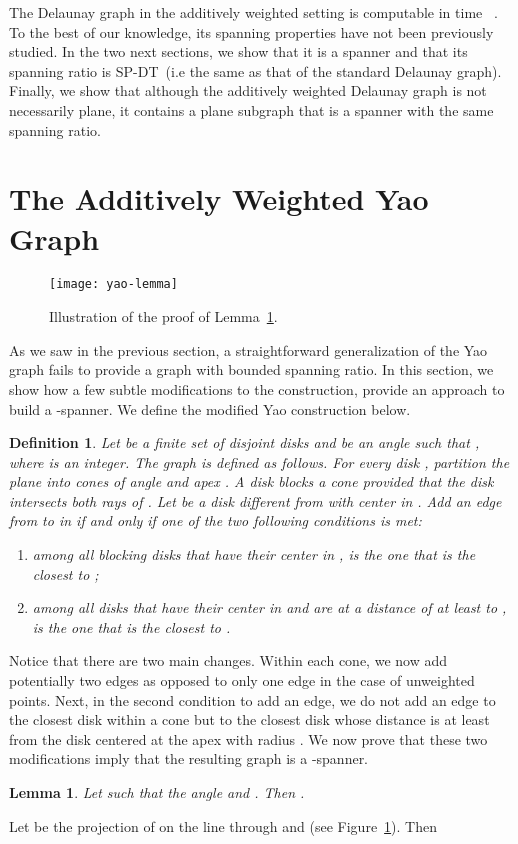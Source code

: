 \documentclass[pdftex,leqno,fleqn,12pt]{article}
\newcommand{\sdsr}{{\rm{SP-DT}}}
\newtheorem{lemma}[theorem]{Lemma}
\newtheorem{definition}[theorem]{Definition}
\newenvironment{proof}{{\textit Proof:} \rm}{\hfill  \medskip\\}
\begin{document}
The Delaunay graph in the additively weighted setting is computable in time
~\cite{fortune87}. To the best of our knowledge, its spanning
properties have not been previously studied. In the two next sections, we show
that it is a spanner and that its spanning ratio is \sdsr\ (i.e the same as
that of the standard Delaunay graph). Finally, we show that although the
additively weighted Delaunay graph is not necessarily plane,  it contains a
plane subgraph that is a spanner with the same spanning ratio.
\section{The Additively Weighted Yao Graph}\label{section-yao}
\begin{figure} \centering\texttt{[image: yao-lemma]}\caption{Illustration of
the proof of Lemma~\ref{lemma-yao}.}\label{fig-lemma-yao} \end{figure}
As we saw in the previous section, a straightforward generalization of the
Yao graph fails to provide a graph with bounded spanning ratio. In this section,
we show how a few subtle modifications to the construction, provide
an approach to build a -spanner. We define the modified
Yao construction below.
\begin{definition} Let  be a finite set of disjoint disks and
 be an angle such that , where  is an
integer. The  graph is defined as follows. For every
disk , partition the plane into  cones  of
angle  and apex . A disk \emph{blocks} a cone  provided
that the disk intersects both rays of . Let  be a
disk different from  with center in . Add an edge from 
to  in  if and only if one of the two following
conditions is met: \begin{enumerate} \item among all blocking disks that have
their center in ,  is the one that is the closest to ; \item
among all disks that have their center in  and are at a distance of at
least  to ,  is the one that is the closest to .  \end{enumerate}
\end{definition}
Notice that there are two main changes. Within each cone, we now add
potentially two edges as opposed to only one edge in the case of unweighted
points. Next, in the second condition to add an edge, we do not add an edge to
the closest disk within a cone but to the closest disk whose distance is at
least  from the disk centered at the apex with radius . We now prove that
these two modifications imply that the resulting graph is a -spanner.
\begin{lemma}\label{lemma-yao} Let  such that the angle  and . Then
.  \end{lemma}
\begin{proof} Let  be the projection of  on the line through 
and  (see Figure~\ref{fig-lemma-yao}). Then  \end{proof}
\end{document}
